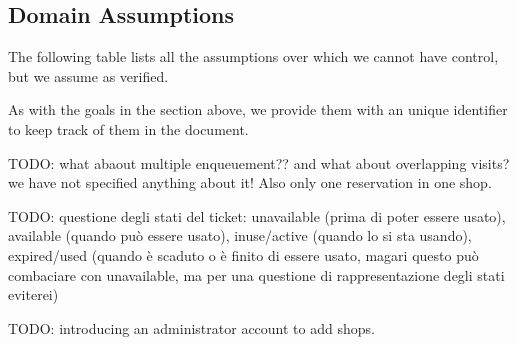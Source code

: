 \FloatBarrier

\subsection{Domain Assumptions}
\label{subsect:domainassumptions}

The following table lists all the assumptions over which we cannot have control, but we assume as verified.

As with the goals in the section above, we provide them with an unique identifier to keep track of them in the document.

TODO: what abaout multiple enqueuement?? and what about overlapping visits? we have not specified anything about it! Also only one reservation in one shop.

TODO: questione degli stati del ticket: unavailable (prima di poter essere usato), available (quando può essere usato), inuse/active (quando lo si sta usando), expired/used (quando è scaduto o è finito di essere usato, magari questo può combaciare con unavailable, ma per una questione di rappresentazione degli stati eviterei)

TODO: introducing an administrator account to add shops.

